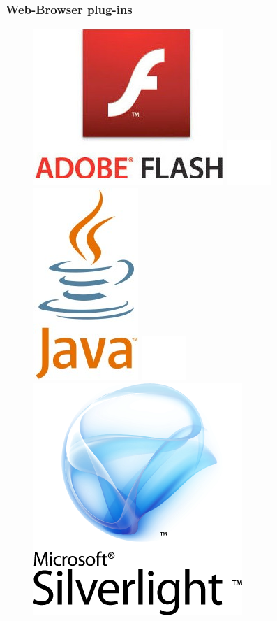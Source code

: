 \documentclass[compress]{beamer}
\begin{document}
 		\begin{frame}[c]
		\frametitle{Web-Browser plug-ins}
		\begin{figure}
			\includegraphics[height=0.3\textheight]{figures/flash.jpg}
			\includegraphics[height=0.1\textheight]{figures/space.png}
			\includegraphics[height=0.3\textheight]{figures/java.jpg}
			\includegraphics[height=0.1\textheight]{figures/space.png}
			\includegraphics[height=0.3\textheight]{figures/silverlight.png}
		\end{figure}
		\end{frame}
\end{document}
